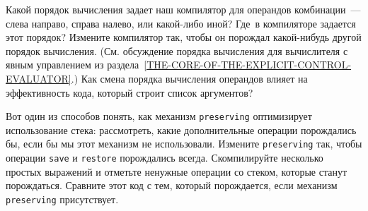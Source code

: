 \begin{exercise}{5.36}%
\label{EX5.36}%
\samepage
Какой порядок вычисления задает наш компилятор для
операндов комбинации~--- слева направо, справа налево, или какой-либо
иной?  Где~в компиляторе задается этот порядок?  Измените компилятор
так, чтобы он порождал какой-нибудь другой порядок
вычисления. (См. обсуждение порядка вычисления для вычислителя с явным
управлением из 
раздела~\ref{THE-CORE-OF-THE-EXPLICIT-CONTROL-EVALUATOR}.)  Как
смена порядка вычисления операндов влияет на эффективность кода,
который строит список аргументов?
\end{exercise}
\begin{exercise}{5.37}%
\label{EX5.37}%
Вот один из способов понять, как механизм
{\tt preserving} 
оптимизирует использование стека:
рассмотреть, какие дополнительные операции порождались бы,
если бы мы этот механизм не использовали.  Измените
{\tt preserving} так, чтобы операции {\tt save} и
{\tt restore} порождались всегда.  Скомпилируйте несколько
простых выражений и отметьте ненужные операции со стеком, которые
станут порождаться.  Сравните этот код с тем, который порождается,
если механизм {\tt preserving} присутствует.
\end{exercise}
